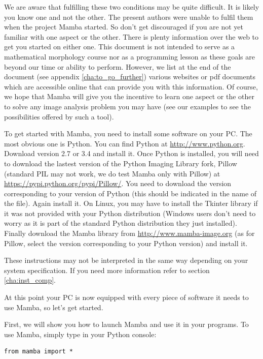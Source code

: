 \documentclass[a4paper,10pt,oneside]{article}
\begin{document}
We are aware that fulfilling these two conditions may be quite difficult. It is 
likely you know one and not the other. The present authors were unable to 
fulfil them when the project Mamba started. So don't get discouraged if you are
not yet familiar with one aspect or the other. There is plenty information over
the web to get you started on either one. This document is not intended to serve
as a mathematical morphology course nor as a programming lesson as these goals are
beyond our time or ability to perform. However, we list at the end of the
document (see appendix \ref{cha:to_go_further}) various websites or pdf documents which are 
accessible online that can provide you with this information. Of course, we hope that
Mamba will give you the incentive to learn one aspect or the other to solve
any image analysis problem you may have (see our examples to see the 
possibilities offered by such a tool).

To get started with Mamba, you need to install some software on your PC. The 
most obvious one is Python. You can find Python at \url{http://www.python.org}. 
Download version 2.7 or 3.4 and install it. Once Python is installed, you will
need to download the lastest version of the Python Imaging Library fork, Pillow
(standard PIL may not work, we do test Mamba only with Pillow) at 
\url{https://pypi.python.org/pypi/Pillow/}.
You need to download the version corresponding to your version of Python (this
should be indicated in the name of the file). Again install it. On Linux, you may
have to install the Tkinter library if it was not provided with your Python
distribution (Windows users don't need to worry as it is part of the standard 
Python distribution they just installed). Finally download the Mamba library 
from \url{http://www.mamba-image.org} (as for Pillow, select the version corresponding
to your Python version) and install it.

These instructions may not be interpreted in the same way depending on your 
system specification. If you need more information refer to section
\ref{cha:inst_comp}.

At this point your PC is now equipped with every piece of software it needs to
use Mamba, so let's get started.

First, we will show you how to launch Mamba and use it in your programs.
To use Mamba, simply type in your Python console:

\lstset{language=Python}
\begin{lstlisting}
from mamba import * 
\end{lstlisting}
\end{document}
